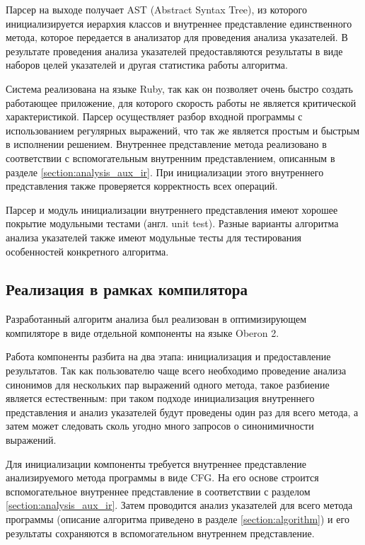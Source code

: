 \documentclass[14pt,titlepage]{extarticle}
\newcommand{\eng}[1]{{\English#1}}
\begin{document}
      Парсер на выходе получает AST (\eng{Abstract Syntax Tree}), из которого
      инициализируется иерархия классов и внутреннее представление
      единственного метода, которое передается в анализатор для проведения
      анализа указателей. В результате проведения анализа указателей
      предоставляются результаты в виде наборов целей указателей и другая
      статистика работы алгоритма.

      Система реализована на языке Ruby, так как он позволяет очень быстро
      создать работающее приложение, для которого скорость работы не является
      критической характеристикой. Парсер осуществляет разбор входной
      программы с использованием регулярных выражений, что так же является
      простым и быстрым в исполнении решением. Внутреннее представление метода
      реализовано в соответствии с вспомогательным внутренним представлением,
      описанным в разделе \ref{section:analysis_aux_ir}.
      При инициализации этого внутреннего представления также проверяется
      корректность всех операций.

      Парсер и модуль инициализации внутреннего представления имеют хорошее
      покрытие модульными тестами (англ. \eng{unit test}). Разные варианты
      алгоритма анализа указателей также имеют модульные тесты для тестирования
      особенностей конкретного алгоритма.

    \subsection{Реализация в рамках компилятора}

      Разработанный алгоритм анализа был реализован в оптимизирующем
      компиляторе в виде отдельной компоненты на языке \eng{Oberon} 2.

      Работа компоненты разбита на два этапа: инициализация и предоставление
      результатов. Так как пользователю чаще всего необходимо проведение
      анализа синонимов для нескольких пар выражений одного метода, такое
      разбиение является естественным: при таком подходе инициализация
      внутреннего представления и анализ указателей будут проведены один раз
      для всего метода, а затем может следовать сколь угодно много запросов о
      синонимичности выражений.

      Для инициализации компоненты требуется внутреннее представление
      анализируемого метода программы в виде CFG. На его основе строится
      вспомогательное внутреннее представление в соответствии с разделом
      \ref{section:analysis_aux_ir}. Затем проводится анализ указателей для
      всего метода программы (описание алгоритма приведено в разделе
      \ref{section:algorithm}) и его результаты сохраняются в вспомогательном
      внутреннем представление.
\end{document}
